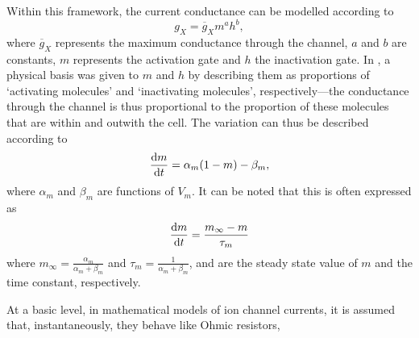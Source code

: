 \documentclass[../thesis-main.tex]{subfiles}
\begin{document}
 Within this framework, the current conductance can be modelled according to
 \begin{equation}
  g_X = \overline{g}_Xm^a h^b,
 \end{equation}
 where $\overline{g}_X$ represents the maximum conductance through the channel, $a$ and $b$ are constants, $m$ represents the activation gate and $h$ the inactivation gate. In \citet{Hodgkin1952}, a physical basis was given to $m$ and $h$ by describing them as proportions of `activating molecules' and `inactivating molecules', respectively---the conductance through the channel is thus proportional to the proportion of these molecules that are within and outwith the cell. The variation can thus be described according to
 \begin{equation}
  \frac{\textnormal{d}m}{\textnormal{d}t} = \alpha_m(1-m)-\beta_m,
 \end{equation}
 where $\alpha_m$ and $\beta_m$ are functions of $V_m$. It can be noted that this is often expressed as
 \begin{equation}
  \frac{\textnormal{d}m}{\textnormal{d}t} = \frac{m_\infty-m}{\tau_m}
 \end{equation}
 where $m_\infty=\frac{\alpha_m}{\alpha_m+\beta_m}$ and $\tau_m=\frac{1}{\alpha_m+\beta_m}$, and are the steady state value of $m$ and the time constant, respectively.
 
 At a basic level, in mathematical models of ion channel currents, it is assumed that, instantaneously, they behave like Ohmic resistors, \idest
 
\end{document}
